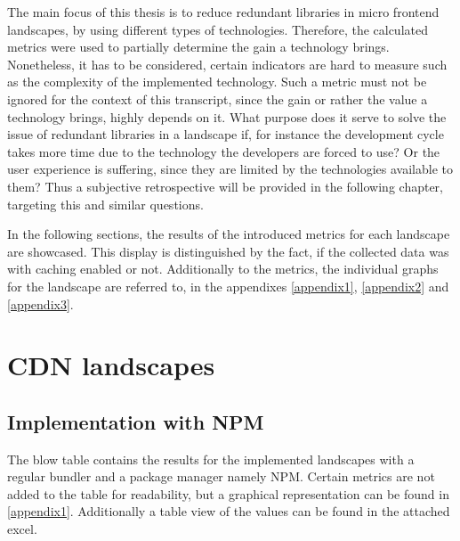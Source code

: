 The main focus of this thesis is to reduce redundant libraries in micro frontend landscapes, by using different types of technologies. Therefore, the calculated metrics were used to partially determine the gain a technology brings. Nonetheless, it has to be considered, certain indicators are hard to measure such as the complexity of the implemented technology.  
Such a metric must not be ignored for the context of this transcript, since the gain or rather the value a technology brings, highly depends on it. What purpose does it serve to solve the issue of redundant libraries in a landscape if, for instance the development cycle takes more time due to the technology the developers are forced to use? Or the user experience is suffering, since they are limited by the technologies available to them?
Thus a subjective retrospective will be provided in the following chapter, targeting this and similar questions.

In the following sections, the results of the introduced metrics for each landscape are showcased. This display is distinguished by the fact, if the collected data was with caching enabled or not. Additionally to the metrics, the individual graphs for the landscape are referred to, in the appendixes \ref{appendix1}, \ref{appendix2} and \ref{appendix3}.

\section{CDN landscapes}

\subsection{Implementation with NPM}

The blow table contains the results for the implemented landscapes with a regular bundler and a package manager namely NPM. Certain metrics are not added to the table for readability, but a graphical representation can be found in \ref{appendix1}. Additionally a table view of the values can be found in the attached excel.

\scriptsize 
\setlength{\mycolwidth}{\dimexpr \textwidth/5 - 2\tabcolsep}%

